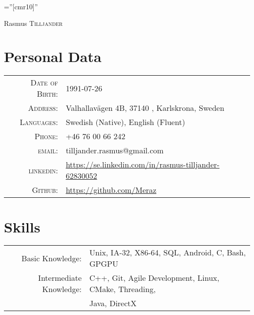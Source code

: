 \documentclass[a4paper,10pt]{article}
\begin{document}

\pagestyle{empty} %

\font\fb=''[cmr10]'' %

\par{\centering
		{\Huge Rasmus \textsc{Tilljander}
	}\bigskip\par}

\section{Personal Data}

\begin{tabular}{rl}
    \textsc{Date of Birth:} &  1991-07-26   \\
    \textsc{Address:}   & Valhallavägen 4B, 37140 , Karlskrona, Sweden \\
    \textsc{Languages:}  & Swedish (Native), English (Fluent) \\
    \textsc{Phone:}     & +46 76 00 66 242\\
    \textsc{email:}     & tilljander.rasmus@gmail.com\\
    \textsc{linkedin:}  & \url{https://se.linkedin.com/in/rasmus-tilljander-62830052}\\
    \textsc{Github:}  & \url{https://github.com/Meraz}
\end{tabular}

\section{Skills}
\begin{tabular}{rl}
Basic Knowledge:& Unix, IA-32, X86-64, SQL, Android, C, Bash, GPGPU \setmainfont[SmallCapsFont=Fontin-SmallCaps.otf]{Fontin.otf}\\
Intermediate Knowledge:& \textsc{C++}, Git, Agile Development, Linux, CMake, Threading,\\&  Java, DirectX\\
\end{tabular}
\end{document}
